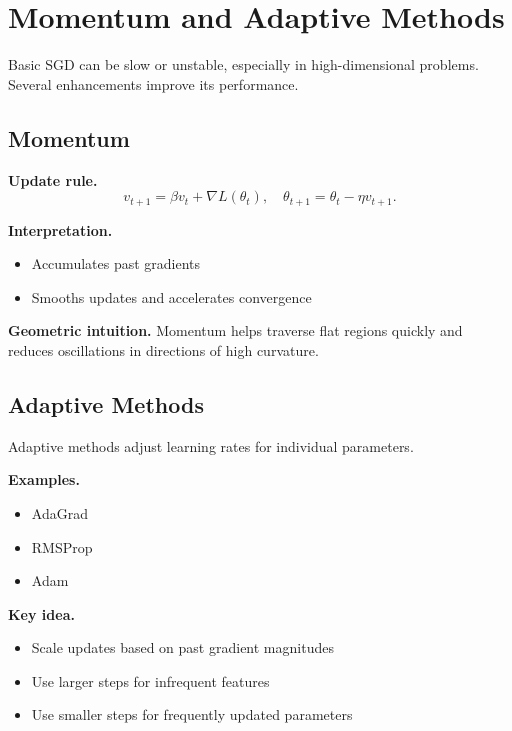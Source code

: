 \section{Momentum and Adaptive Methods}

Basic SGD can be slow or unstable, especially in high-dimensional problems. Several enhancements improve its performance.

\subsection{Momentum}

\medskip

\noindent
\textbf{Update rule.}
\[
v_{t+1} = \beta v_t + \nabla L(\theta_t), \quad
\theta_{t+1} = \theta_t - \eta v_{t+1}.
\]

\medskip

\noindent
\textbf{Interpretation.}
\begin{itemize}
    \item Accumulates past gradients
    \item Smooths updates and accelerates convergence
\end{itemize}

\medskip

\noindent
\textbf{Geometric intuition.}  
Momentum helps traverse flat regions quickly and reduces oscillations in directions of high curvature.

\subsection{Adaptive Methods}

Adaptive methods adjust learning rates for individual parameters.

\medskip

\noindent
\textbf{Examples.}
\begin{itemize}
    \item AdaGrad
    \item RMSProp
    \item Adam
\end{itemize}

\medskip

\noindent
\textbf{Key idea.}
\begin{itemize}
    \item Scale updates based on past gradient magnitudes
    \item Use larger steps for infrequent features
    \item Use smaller steps for frequently updated parameters
\end{itemize}

